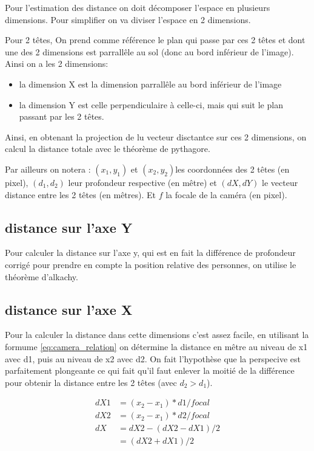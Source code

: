 

Pour l'estimation des distance on doit décomposer l'espace en plusieurs dimensions. Pour simplifier on va diviser l'espace en 2 dimensions.

Pour 2 têtes, On prend comme référence le plan qui passe par ces 2 têtes et dont une des 2 dimensions est parrallêle au sol (donc au bord inférieur de l'image). Ainsi on a les 2 dimensions:

\begin{itemize}
    \item la dimension X est la dimension parrallêle au bord inférieur de l'image
    \item la dimension Y est celle perpendiculaire à celle-ci, mais qui suit le plan passant par les 2 têtes.
\end{itemize}


Ainsi, en obtenant la projection de lu vecteur disctantce sur ces 2 dimensions, on calcul la distance totale avec le théorème de pythagore.

Par ailleurs on notera : $(x_1, y_1)$ et $(x_2, y_2) $les coordonnées des 2 têtes (en pixel), $(d_1,d_2)$ leur profondeur respective (en mêtre) et $(dX, dY)$ le vecteur distance entre les 2 têtes (en mêtres). Et $f$ la focale de la caméra (en pixel).

\subsection{distance sur l'axe Y}

Pour calculer la distance sur l'axe y, qui est en fait la différence de profondeur corrigé pour prendre en compte la position relative des personnes, on utilise le théorème d'alkachy.

\subsection{distance sur l'axe X}

Pour la calculer la distance dans cette dimensions c'est assez facile, en utilisant la formume \ref{eq:camera_relation} on détermine la distance en mêtre au niveau de x1 avec d1, puis au niveau de x2 avec d2.
On fait l'hypothèse que la perspecive est parfaitement plongeante ce qui fait qu'il faut enlever la moitié de la différence pour obtenir la distance entre les 2 têtes (avec $d_2>d_1$).

\begin{align}
    dX1 &= (x_2-x_1) * d1 / focal \\
    dX2 &= (x_2-x_1) * d2 / focal \\
    dX  &= dX2 - (dX2-dX1)/2 \\
        &= (dX2 + dX1) /2
\end{align}


